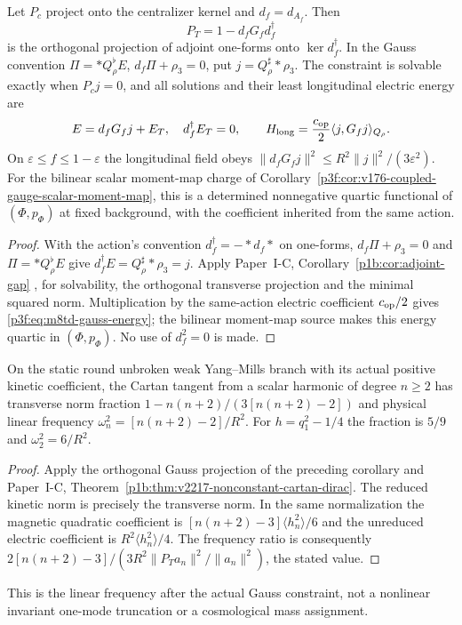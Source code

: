 \documentclass[11pt,a4paper]{article}
\begin{document}
\begin{corollary}
\label{p3f:cor:m8td-gauss-response}
Let $P_c$ project onto the centralizer kernel and $d_f=d_{A_f}$. Then
\[
 P_T=1-d_fG_fd_f^\dagger
\]
is the orthogonal projection of adjoint one-forms onto $\ker d_f^\dagger$.
In the Gauss convention $\Pi=*Q_\rho^\flat E$,
$d_f\Pi+\rho_3=0$, put $j=Q_\rho^\sharp *\rho_3$. The constraint is
solvable exactly when $P_cj=0$, and all solutions and their least
longitudinal electric energy are
\begin{equation}
 E=d_fG_fj+E_T,\quad d_f^\dagger E_T=0,\qquad
 H_{\mathrm{long}}=\frac{c_{\rm op}}2\langle j,G_fj\rangle_{Q_\rho}.
 \label{p3f:eq:m8td-gauss-energy}
\end{equation}
On $\varepsilon\le f\le1-\varepsilon$ the longitudinal field obeys
$\|d_fG_fj\|^2\le R^2\|j\|^2/(3\varepsilon^2)$.
For the bilinear scalar moment-map charge of
Corollary~\ref{p3f:cor:v176-coupled-gauge-scalar-moment-map}, this is a
determined nonnegative quartic functional of $(\Phi,p_\Phi)$ at fixed
background, with the coefficient inherited from the same action.
\end{corollary}
\begin{proof}
With the action's convention \(d_f^\dagger=-*d_f*\) on one-forms,
\(d_f\Pi+\rho_3=0\) and \(\Pi=*Q_\rho^\flat E\) give
\(d_f^\dagger E=Q_\rho^\sharp*\rho_3=j\).
Apply Paper~I-C, Corollary~\ref{p1b:cor:adjoint-gap}
\cite{Kugelmann2026Paper1C}, for solvability, the orthogonal transverse
projection and the minimal squared norm. Multiplication by the same-action
electric coefficient \(c_{\rm op}/2\) gives
\eqref{p3f:eq:m8td-gauss-energy}; the bilinear moment-map source makes this
energy quartic in \((\Phi,p_\Phi)\). No use of \(d_f^2=0\) is made.
\end{proof}

\begin{corollary}
\label{p3f:cor:v2217-cartan-transverse-mode}
On the static round unbroken weak Yang--Mills branch with its actual
positive kinetic coefficient, the Cartan tangent from a scalar harmonic of
degree $n\ge2$ has transverse norm fraction
$1-n(n+2)/(3[n(n+2)-2])$ and physical linear frequency
$\omega_n^2=[n(n+2)-2]/R^2$. For $h=q_1^2-1/4$ the fraction is $5/9$
and $\omega_2^2=6/R^2$.
\end{corollary}
\begin{proof}
Apply the orthogonal Gauss projection of the preceding corollary and
Paper~I-C, Theorem~\ref{p1b:thm:v2217-nonconstant-cartan-dirac}.
The reduced kinetic norm is precisely the transverse norm. In the same
normalization the magnetic quadratic coefficient is
$[n(n+2)-3]\langle h_n^2\rangle/6$ and the unreduced electric coefficient
is $R^2\langle h_n^2\rangle/4$. The frequency ratio is consequently
$2[n(n+2)-3]/(3R^2\|P_Ta_n\|^2/\|a_n\|^2)$, the stated value.
\end{proof}
This is the linear frequency after the actual Gauss constraint, not a
nonlinear invariant one-mode truncation or a cosmological mass assignment.
\end{document}
